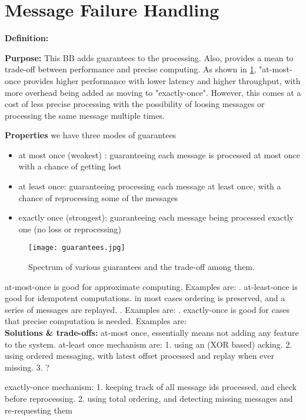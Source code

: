 \section{Message Failure Handling}

	\noindent\textbf{Definition:} 

	\noindent \textbf{Purpose:} This BB adds guarantees to the processing. Also, provides a mean to trade-off between performance and precise computing. As shown in \ref{fig:guarantees}, "at-most-once provides higher performance with lower latency and higher throughput, with more overhead being added as moving to "exactly-once". However, this comes at a cost of less precise processing with the possibility of loosing messages or processing the same message multiple times.
	
	\noindent \textbf{Properties}
	we have three modes of guarantees 
	\begin{itemize}
		\item at most once (weakest) : guaranteeing each message is processed at most once with a chance of getting lost
		\item at least once: guaranteeing processing each message at least once, with a chance of reprocessing some of the messages
		\item exactly once (strongest): guaranteeing each message being processed exactly one (no loss or reprocessing)
	\end{itemize}	 
	\begin{figure}[h]
		\centering
		\texttt{[image: guarantees.jpg]}
		\caption{Spectrum of various guarantees and the trade-off among them.}
		\label{fig:guarantees}
	\end{figure}
	
	at-most-once is good for approximate computing. Examples are: . at-least-once is good for idempotent computations. in most cases ordering is preserved, and a series of messages are replayed. . Examples are: .  exactly-once is good for cases that precise computation is needed. Examples are: \\
	

\noindent \textbf{Solutions \& trade-offs:} at-most once, essentially means not adding any feature to the system. at-least once mechanism are: 1. using an (XOR based) acking. 2. using ordered messaging, with latest offset processed and replay when ever missing. 3. ?

exactly-once mechanism: 1. keeping track of all message ids processed, and check before reprocessing. 2. using total ordering, and detecting missing messages and re-requesting them 
 \\

